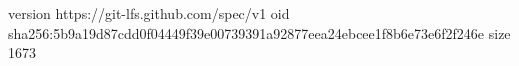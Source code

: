 version https://git-lfs.github.com/spec/v1
oid sha256:5b9a19d87cdd0f04449f39e00739391a92877eea24ebcee1f8b6e73e6f2f246e
size 1673
